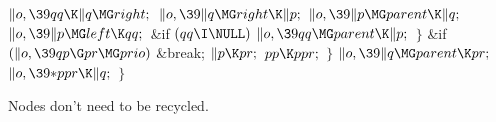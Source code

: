 ${}\|o,\39\\{qq}\K\|q\MG\\{right};{}$\6
${}\|o,\39\|q\MG\\{right}\K\|p;{}$\6
${}\|o,\39\|p\MG\\{parent}\K\|q;{}$\6
${}\|o,\39\|p\MG\\{left}\K\\{qq};{}$\6
\&{if} ${}(\\{qq}\I\NULL){}$\1\5
${}\|o,\39\\{qq}\MG\\{parent}\K\|p;{}$\2\6
\4${}\}{}$\2\6
\&{if} ${}(\|o,\39\\{qp}\G\\{pr}\MG\\{prio}){}$\1\5
\&{break};\2\6
${}\|p\K\\{pr};{}$\6
${}\\{pp}\K\\{ppr};{}$\6
\4${}\}{}$\2\6
${}\|o,\39\|q\MG\\{parent}\K\\{pr};{}$\6
${}\|o,\39{*}\\{ppr}\K\|q;{}$\6
\4${}\}{}$\2\par
\fi

Nodes don't need to be recycled.

